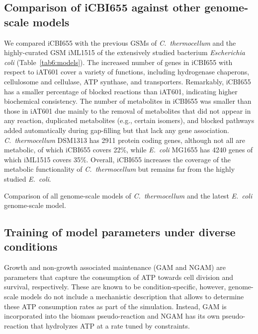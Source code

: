 \subsection{Comparison of iCBI655 against other genome-scale models}
We compared iCBI655 with the previous GSMs of \textit{C.~thermocellum} and the highly-curated GSM iML1515 of the extensively studied bacterium \textit{Escherichia coli} (Table~\ref{tab6:models}).
The increased number of genes in iCBI655 with respect to iAT601 cover a variety of functions, including hydrogenase chaperons, cellulosome and cellulase, ATP synthase, and transporters.
Remarkably, iCBI655 has a smaller percentage of blocked reactions than iAT601, indicating higher biochemical consistency. The number of metabolites in iCBI655 was smaller than those in iAT601 due mainly to the removal of metabolites that did not appear in any reaction, duplicated metabolites (e.g., certain isomers), and blocked pathways added automatically during gap-filling but that lack any gene association. \textit{C.~thermocellum} DSM1313 has 2911 protein coding genes, although not all are metabolic, of which iCBI655 covers 22\%, while \textit{E.~coli} MG1655 has 4240 genes of which iML1515 covers 35\%. Overall, iCBI655 increases the coverage of the metabolic functionality of \textit{C.~thermocellum} but remains far from the highly studied \textit{E.~coli}.


\begin{table}[h]
    \caption[Comparison of all genome-scale models of \textit{C.~thermocellum}]{Comparison of all genome-scale models of \textit{C.~thermocellum} and the latest \textit{E.~coli} genome-scale model.}
    \centering
    
    \label{tab6:models}
\end{table}


\subsection{Training of model parameters under diverse conditions}

Growth and non-growth associated maintenance (GAM and NGAM) are parameters that capture the consumption of ATP towards cell division and survival, respectively. These are known to be condition-specific, however, genome-scale models do not include a mechanistic description that allows to determine these ATP consumption rates as part of the simulation. Instead, GAM is incorporated into the biomass pseudo-reaction and NGAM has its own pseudo-reaction that hydrolyzes ATP at a rate tuned by constraints.

